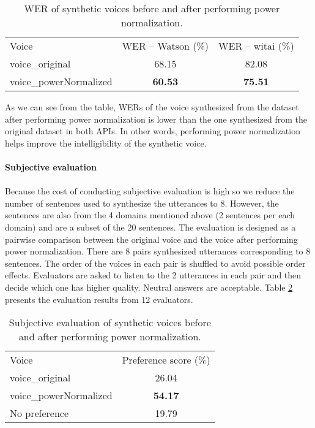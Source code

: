 \documentclass[12pt]{article}
\begin{document}
\begin{table}[]
\begin{center}
\caption{WER of synthetic voices before and after performing power normalization.}
\label{tab_werPower}
\vspace{3mm}
\begin{tabular}{lcc}
\hline
Voice & WER – Watson (\%) & WER – witai (\%) \\
\cmidrule(l{0pt}r{2pt}){1-1}\cmidrule(l{0pt}r{2pt}){2-2}\cmidrule(l{0pt}r{2pt}){3-3}
voice\_original          & 68.15          & 82.08 \\
voice\_powerNormalized   & \textbf{60.53} & \textbf{75.51} \\
\hline
\end{tabular}
\end{center}
\end{table}

As we can see from the table, WERs of the voice synthesized from the dataset after performing power normalization is lower than the one synthesized from the original dataset in both APIs. In other words, performing power normalization helps improve the intelligibility of the synthetic voice.\\\\
\textbf{Subjective evaluation}\\\\
Because the cost of conducting subjective evaluation is high so we reduce the number of sentences used to synthesize the utterances to 8. However, the sentences are also from the 4 domains mentioned above (2 sentences per each domain) and are a subset of the 20 sentences. The evaluation is designed as a pairwise comparison between the original voice and the voice after performing power normalization. There are 8 pairs synthesized utterances corresponding to 8 sentences. The order of the voices in each pair is shuffled to avoid possible order effects. Evaluators are asked to listen to the 2 utterances in each pair and then decide which one has higher quality. Neutral answers are acceptable. Table \ref{tab_subEvaPower} presents the evaluation results from 12 evaluators.

\begin{table}[]
\begin{center}
\caption{Subjective evaluation of synthetic voices before and after performing power normalization.}
\label{tab_subEvaPower}
\vspace{3mm}
\begin{tabular}{lc}
\hline
Voice & Preference score (\%) \\
\cmidrule(l{0pt}r{2pt}){1-1}\cmidrule(l{0pt}r{2pt}){2-2}
voice\_original         & 26.04 \\
voice\_powerNormalized  & \textbf{54.17} \\
No preference           & 19.79 \\
\hline
\end{tabular}
\end{center}
\end{table}
\end{document}
